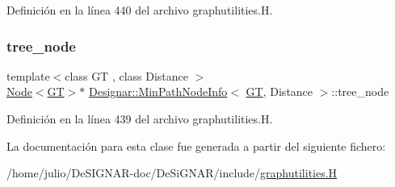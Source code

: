 Definición en la línea 440 del archivo graphutilities.\+H.

\mbox{\label{class_designar_1_1_min_path_node_info_a0121695ed8523a60ee92375767a5c169}} 
\subsubsection{\texorpdfstring{tree\+\_\+node}{tree\_node}}
{\footnotesize\ttfamily template$<$class GT , class Distance $>$ \\
\hyperlink{namespace_designar_a5af326c65aa2bd26b26c410f2030d09e}{Node}$<$\hyperlink{demo-buildgraph_8_c_a3001c40d2c31ca87ed96cd7d1334a55e}{GT}$>$$\ast$ \hyperlink{class_designar_1_1_min_path_node_info}{Designar\+::\+Min\+Path\+Node\+Info}$<$ \hyperlink{demo-buildgraph_8_c_a3001c40d2c31ca87ed96cd7d1334a55e}{GT}, Distance $>$\+::tree\+\_\+node}



Definición en la línea 439 del archivo graphutilities.\+H.



La documentación para esta clase fue generada a partir del siguiente fichero\+:\begin{DoxyCompactItemize}
\item 
/home/julio/\+De\+S\+I\+G\+N\+A\+R-\/doc/\+De\+Si\+G\+N\+A\+R/include/\hyperlink{graphutilities_8_h}{graphutilities.\+H}\end{DoxyCompactItemize}
